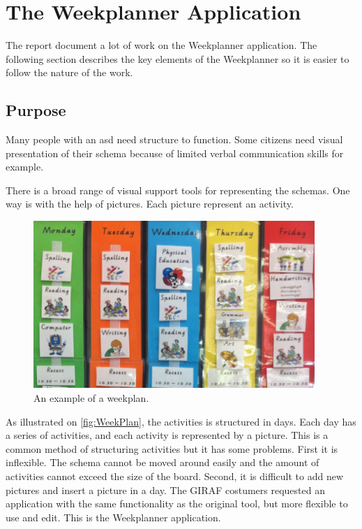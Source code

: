 \section{The Weekplanner Application}\label{sec:TheWeekplannerApplication}

The report document a lot of work on the Weekplanner application. The following section describes the key elements of the Weekplanner so it is easier to follow the nature of the work.

\subsection{Purpose}
Many people with an \gls{asd} need structure to function. Some \glspl{citizen} need visual presentation\cite{VisualSupport} of their schema because of limited verbal communication skills for example. 

There is a broad range of visual support tools for representing the schemas. One way is with the help of pictures. Each picture represent an activity.

\begin{figure}[H]
    \begin{center}
        \includegraphics[width=0.95\textwidth]{figures/WeekPlanEks.png}
    \end{center}
    \caption{An example of a weekplan.\cite{VisualSupport}}
    \label{fig:WeekPlan}
\end{figure}

As illustrated on \autoref{fig:WeekPlan}, the activities is structured in days. Each day has a series of activities, and each activity is represented by a picture.
This is a common method of structuring activities but it has some problems. First it is inflexible. The schema cannot be moved around easily and the amount of activities cannot exceed the size of the board. Second, it is difficult to add new pictures and insert a picture in a day. 
The GIRAF costumers requested an application with the same functionality as the original tool, but more flexible to use and edit. This is the Weekplanner application. 

